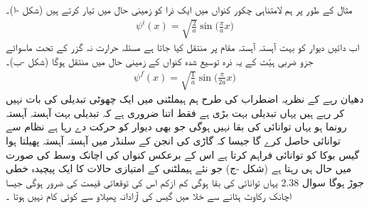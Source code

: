  مثال کے طور پر ہم لامتناہی چکور کنواں میں ایک ذرا کو زمینی حال میں تیار کرتے ہیں (شکل -ا)۔
\begin{align}
\psi^i (x) = \sqrt{\frac{2}{a}} \sin \big ( \frac{\pi}{a} x \big )
\end{align}
 اب دائیں  دیوار کو بہت آہستہ آہستہ مقام  پر منتقل کیا جاتا ہے مسئلہ حرارت نہ گزر کے تحت ماسوائے جزو ضربی ہیّت کے یہ ذرہ توسیع شدہ کنواں کے زمینی حال میں منتقل ہوگا  (شکل  -ب)۔
\begin{align}
\psi^f (x) = \sqrt{\frac{1}{a}} \sin \big ( \frac{\pi}{2a} x \big )
\end{align}
دھیان رہے کے نظریہ اضطراب کی طرح ہم ہيملٹنی میں ایک چھوٹی تبدیلی کی بات نہیں کر رہے ہیں یہاں تبدیلی بہت بڑی ہے فقط اتنا ضروری ہے کہ تبدیلی بہت آہستہ آہستہ رونما ہو یہاں توانائی کی بقا نہیں ہوگی جو بھی دیوار کو حرکت دے رہا ہے نظام سے توانائی حاصل کرے گا جیسا کہ گاڑی کی انجن کے سلنڈر میں آہستہ آہستہ پھیلتا ہوا گیس بوکا کو توانائی فراہم کرتا ہے اس کے برعکس کنواں کی اچانک وسط کی صورت میں حال  ہی رہتا ہے  (شکل  -ج)  جو نئے ہیملٹنی کے امتیازی حالات کا ایک پیچیدہ خطی جوڑ ہوگا سوال 2.38 یہاں توانائی کی بقا ہوگی کم ازکم اس کی توقعاتی قیمت کی ضرور ہوگی جیسا اچانک رکاوٹ ہٹانے سے خلا میں گیس کی آزادانہ پھیلاو سے کوئی کام نہیں ہوتا ۔


